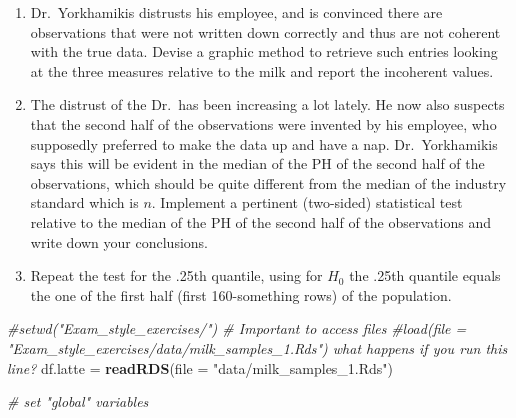 \documentclass[
]{article}
\newenvironment{Shaded}{\begin{snugshade}}{\end{snugshade}}
\newcommand{\AttributeTok}[1]{\textcolor[rgb]{0.13,0.29,0.53}{#1}}
\newcommand{\CommentTok}[1]{\textcolor[rgb]{0.56,0.35,0.01}{\textit{#1}}}
\newcommand{\FunctionTok}[1]{\textcolor[rgb]{0.13,0.29,0.53}{\textbf{#1}}}
\newcommand{\NormalTok}[1]{#1}
\newcommand{\OtherTok}[1]{\textcolor[rgb]{0.56,0.35,0.01}{#1}}
\newcommand{\StringTok}[1]{\textcolor[rgb]{0.31,0.60,0.02}{#1}}
\begin{document}
\begin{enumerate}
\def\labelenumi{\arabic{enumi}.}
\item
  Dr.~Yorkhamikis distrusts his employee, and is convinced there are
  observations that were not written down correctly and thus are not
  coherent with the true data. Devise a graphic method to retrieve such
  entries looking at the three measures relative to the milk and report
  the incoherent values.
\item
  The distrust of the Dr.~has been increasing a lot lately. He now also
  suspects that the second half of the observations were invented by his
  employee, who supposedly preferred to make the data up and have a nap.
  Dr.~Yorkhamikis says this will be evident in the median of the PH of
  the second half of the observations, which should be quite different
  from the median of the industry standard which is \(n\). Implement a
  pertinent (two-sided) statistical test relative to the median of the
  PH of the second half of the observations and write down your
  conclusions.
\item
  Repeat the test for the .25th quantile, using for \(H_0\) the .25th
  quantile equals the one of the first half (first 160-something rows)
  of the population.
\end{enumerate}

\begin{Shaded}
\begin{Highlighting}[]
\CommentTok{\#setwd("Exam\_style\_exercises/") \# Important to access files}
\CommentTok{\#load(file = "Exam\_style\_exercises/data/milk\_samples\_1.Rds") what happens if you run this line?}
\NormalTok{df.latte }\OtherTok{=} \FunctionTok{readRDS}\NormalTok{(}\AttributeTok{file =} \StringTok{"data/milk\_samples\_1.Rds"}\NormalTok{)}

\CommentTok{\# set "global" variables}
\end{Highlighting}
\end{Shaded}
\end{document}
